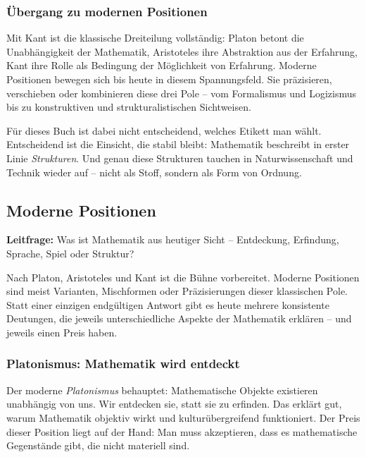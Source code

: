 \subsubsection*{Übergang zu modernen Positionen}

Mit Kant ist die klassische Dreiteilung vollständig:
Platon betont die Unabhängigkeit der Mathematik,
Aristoteles ihre Abstraktion aus der Erfahrung,
Kant ihre Rolle als Bedingung der Möglichkeit von Erfahrung.
Moderne Positionen bewegen sich bis heute in diesem Spannungsfeld.
Sie präzisieren,
verschieben oder kombinieren diese drei Pole --
vom Formalismus und Logizismus
bis zu konstruktiven und strukturalistischen Sichtweisen.

Für dieses Buch ist dabei nicht entscheidend,
welches Etikett man wählt.
Entscheidend ist die Einsicht,
die stabil bleibt:
Mathematik beschreibt in erster Linie \emph{Strukturen}.
Und genau diese Strukturen tauchen in Naturwissenschaft und Technik wieder auf --
nicht als Stoff,
sondern als Form von Ordnung.


\subsection{Moderne Positionen}
\label{sec:8.4}

\textbf{Leitfrage:} Was ist Mathematik aus heutiger Sicht -- Entdeckung, Erfindung, Sprache, Spiel oder Struktur?

\medskip

Nach Platon,
Aristoteles und Kant ist die Bühne vorbereitet.
Moderne Positionen sind meist Varianten,
Mischformen oder Präzisierungen dieser klassischen Pole.
Statt einer einzigen endgültigen Antwort gibt es heute mehrere konsistente Deutungen,
die jeweils unterschiedliche Aspekte der Mathematik erklären --
und jeweils einen Preis haben.

\subsubsection*{Platonismus: Mathematik wird entdeckt}

Der moderne \emph{Platonismus} behauptet:
Mathematische Objekte existieren unabhängig von uns.
Wir entdecken sie,
statt sie zu erfinden.
Das erklärt gut,
warum Mathematik objektiv wirkt
und kulturübergreifend funktioniert.
Der Preis dieser Position liegt auf der Hand:
Man muss akzeptieren,
dass es mathematische Gegenstände gibt,
die nicht materiell sind.

